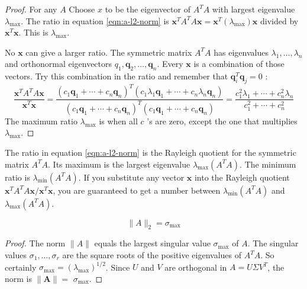 \begin{proof}
    For any $A$ Choose $x$ to be the eigenvector of $A^{{T}} A$ with largest eigenvalue $\lambda_{\max } .$ The ratio in equation \ref{eqn:a-l2-norm} is $\boldsymbol{x}^{{T}} A^{{T}} A \boldsymbol{x}=\boldsymbol{x}^{{T}}\left(\lambda_{\max }\right) \boldsymbol{x}$ divided by $\boldsymbol{x}^{{T}} \boldsymbol{x}$. This is $\lambda_{\max }$.

No $\boldsymbol{x}$ can give a larger ratio. The symmetric matrix $A^{{T}} A$ has eigenvalues $\lambda_{1}, \ldots, \lambda_{n}$ and orthonormal eigenvectors $q_{1}, \boldsymbol{q}_{2}, \ldots, \boldsymbol{q}_{n} .$ Every $\boldsymbol{x}$ is a combination of those vectors. Try this combination in the ratio and remember that $\boldsymbol{q}_{i}^{{T}} \boldsymbol{q}_{j}=0$ :
$$
\frac{\boldsymbol{x}^{{T}} A^{{T}} A \boldsymbol{x}}{\boldsymbol{x}^{{T}} \boldsymbol{x}}=\frac{\left(c_{1} \boldsymbol{q}_{1}+\cdots+c_{n} \boldsymbol{q}_{n}\right)^{{T}}\left(c_{1} \lambda_{1} \boldsymbol{q}_{1}+\cdots+c_{n} \lambda_{n} \boldsymbol{q}_{n}\right)}{\left(c_{1} \boldsymbol{q}_{1}+\cdots+c_{n} \boldsymbol{q}_{n}\right)^{{T}}\left(c_{1} \boldsymbol{q}_{1}+\cdots+c_{n} \boldsymbol{q}_{n}\right)}=\frac{c_{1}^{2} \lambda_{1}+\cdots+c_{n}^{2} \lambda_{n}}{c_{1}^{2}+\cdots+c_{n}^{2}}
$$
The maximum ratio $\lambda_{\max }$ is when all $c$ 's are zero, except the one that multiplies $\lambda_{\max }$.
\end{proof}

\begin{remark}
    The ratio in equation \ref{eqn:a-l2-norm} is the Rayleigh quotient for the symmetric matrix $A^{{T}} A$. Its maximum is the largest eigenvalue $\lambda_{\max }\left(A^{{T}} A\right) .$ The minimum ratio is $\lambda_{\min }\left(A^{{T}} A\right)$. If you substitute any vector $\boldsymbol{x}$ into the Rayleigh quotient $\boldsymbol{x}^{{T}} A^{{T}} A \boldsymbol{x} / \boldsymbol{x}^{{T}} \boldsymbol{x}$, you are guaranteed to get a number between $\lambda_{\min }\left(A^{{T}} A\right)$ and $\lambda_{\max }\left(A^{{T}} A\right)$.
\end{remark}

\begin{corollary}
    $$\|A\|_{2}= \sigma_{\max} $$
\end{corollary}

\begin{proof}
    The norm $\|A\|$ equals the largest singular value $\sigma_{\max }$ of $A$. The singular values $\sigma_{1}, \ldots, \sigma_{r}$ are the square roots of the positive eigenvalues of $A^{{T}} A$. So certainly $\sigma_{\max }=\left(\lambda_{\max }\right)^{1 / 2}$. Since $U$ and $V$ are orthogonal in $A=U \Sigma V^{{T}}$, the norm is $\|\boldsymbol{A}\|=$ $\sigma_{\max }$.
\end{proof}

